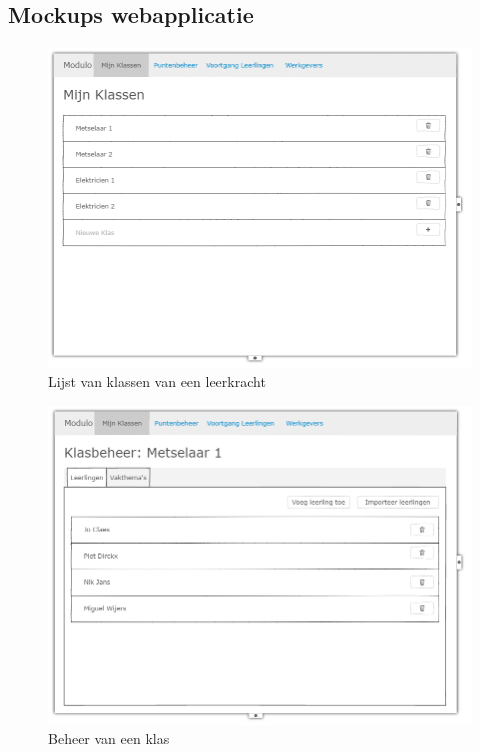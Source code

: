 \documentclass[a4paper]{article}
\begin{document}
\newpage
\begin{appendices}
\section{Mockups webapplicatie}

\begin{figure}[H]
  \centerline{\includegraphics[width=\textwidth]{web_klassen}}
  \caption{Lijst van klassen van een leerkracht}
  \label{fig:web_klassen}
\end{figure}

\begin{figure}[H]
  \centerline{\includegraphics[width=\textwidth]{web_klasbeheer}}
  \caption{Beheer van een klas}
  \label{fig:web_klasbeheer}
\end{figure}


\end{appendices}
\end{document}
